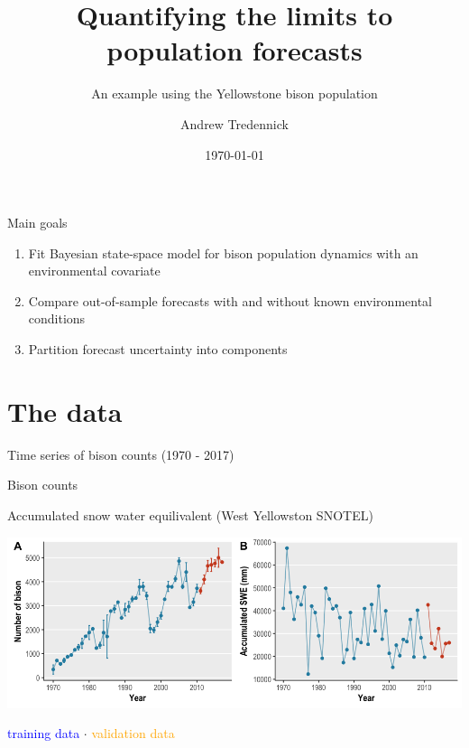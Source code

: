 \documentclass[11pt, compress, aspectratio=1610]{beamer}
\title{Quantifying the limits to population forecasts}
\subtitle{An example using the Yellowstone bison population}
\date{\today}
\author{Andrew Tredennick}
\institute{Utah State University}
\providecommand{\tightlist}{%
  \setlength{\itemsep}{0pt}\setlength{\parskip}{0pt}}
\begin{document}
\maketitle

\begin{frame}{%
\protect\hypertarget{main-goals}{%
Main goals}}

\begin{enumerate}
[1.]
\tightlist
\item
  Fit Bayesian state-space model for bison population dynamics
  \alert{with} an environmental covariate
\item
  Compare out-of-sample forecasts with and without known environmental
  conditions
\item
  Partition forecast uncertainty into components
\end{enumerate}

\end{frame}

\hypertarget{the-data}{%
\section{The data}\label{the-data}}

\begin{frame}{%
\protect\hypertarget{time-series-of-bison-counts-1970---2017}{%
Time series of bison counts (1970 - 2017)}}

\begin{description}
\tightlist
\item[Response]
Bison counts
\item[Covariate]
Accumulated snow water equilivalent (West Yellowston SNOTEL)
\end{description}

\includegraphics[width=\textwidth]{../figures/bison_data_plots.png}

\begin{center}
\textcolor{blue}{training data} $\cdot$ \textcolor{orange}{validation data}
\end{center}

\end{frame}
\end{document}

